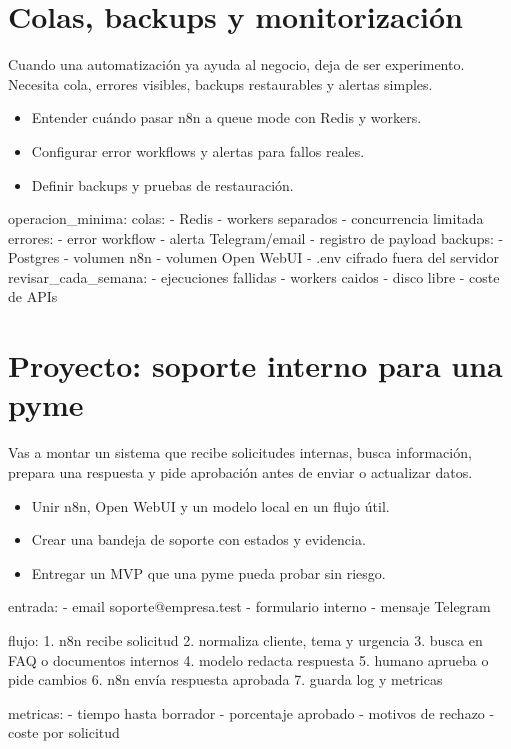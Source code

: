 \documentclass[11pt,a4paper]{book}
\begin{document}
\chapter{Colas, backups y monitorización}
Cuando una automatización ya ayuda al negocio, deja de ser experimento. Necesita cola, errores visibles, backups restaurables y alertas simples.

\begin{itemize}\item Entender cuándo pasar n8n a queue mode con Redis y workers.\end{itemize}
\begin{itemize}\item Configurar error workflows y alertas para fallos reales.\end{itemize}
\begin{itemize}\item Definir backups y pruebas de restauración.\end{itemize}
\begin{codebox}
operacion_minima:
  colas:
    - Redis
    - workers separados
    - concurrencia limitada
  errores:
    - error workflow
    - alerta Telegram/email
    - registro de payload
  backups:
    - Postgres
    - volumen n8n
    - volumen Open WebUI
    - .env cifrado fuera del servidor
  revisar_cada_semana:
    - ejecuciones fallidas
    - workers caidos
    - disco libre
    - coste de APIs
\end{codebox}
\chapter{Proyecto: soporte interno para una pyme}
Vas a montar un sistema que recibe solicitudes internas, busca información, prepara una respuesta y pide aprobación antes de enviar o actualizar datos.

\begin{itemize}\item Unir n8n, Open WebUI y un modelo local en un flujo útil.\end{itemize}
\begin{itemize}\item Crear una bandeja de soporte con estados y evidencia.\end{itemize}
\begin{itemize}\item Entregar un MVP que una pyme pueda probar sin riesgo.\end{itemize}
\begin{codebox}
entrada:
  - email soporte@empresa.test
  - formulario interno
  - mensaje Telegram

flujo:
  1. n8n recibe solicitud
  2. normaliza cliente, tema y urgencia
  3. busca en FAQ o documentos internos
  4. modelo redacta respuesta
  5. humano aprueba o pide cambios
  6. n8n envía respuesta aprobada
  7. guarda log y metricas

metricas:
  - tiempo hasta borrador
  - porcentaje aprobado
  - motivos de rechazo
  - coste por solicitud
\end{codebox}
\end{document}
